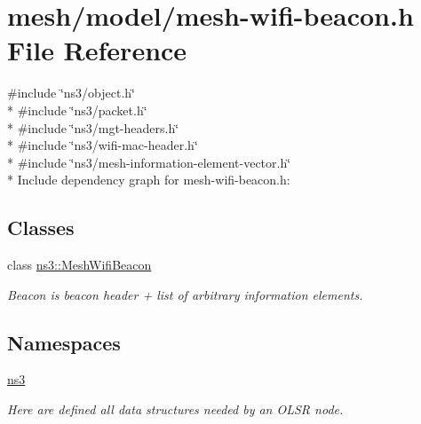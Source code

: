 \hypertarget{mesh-wifi-beacon_8h}{}\section{mesh/model/mesh-\/wifi-\/beacon.h File Reference}
\label{mesh-wifi-beacon_8h}
{\ttfamily \#include \char`\"{}ns3/object.\+h\char`\"{}}\\*
{\ttfamily \#include \char`\"{}ns3/packet.\+h\char`\"{}}\\*
{\ttfamily \#include \char`\"{}ns3/mgt-\/headers.\+h\char`\"{}}\\*
{\ttfamily \#include \char`\"{}ns3/wifi-\/mac-\/header.\+h\char`\"{}}\\*
{\ttfamily \#include \char`\"{}ns3/mesh-\/information-\/element-\/vector.\+h\char`\"{}}\\*
Include dependency graph for mesh-\/wifi-\/beacon.h\+:
\subsection*{Classes}
\begin{DoxyCompactItemize}
\item 
class \hyperlink{classns3_1_1MeshWifiBeacon}{ns3\+::\+Mesh\+Wifi\+Beacon}
\begin{DoxyCompactList}\small\item\em Beacon is beacon header + list of arbitrary information elements. \end{DoxyCompactList}\end{DoxyCompactItemize}
\subsection*{Namespaces}
\begin{DoxyCompactItemize}
\item 
 \hyperlink{namespacens3}{ns3}
\begin{DoxyCompactList}\small\item\em Here are defined all data structures needed by an O\+L\+SR node. \end{DoxyCompactList}\end{DoxyCompactItemize}
